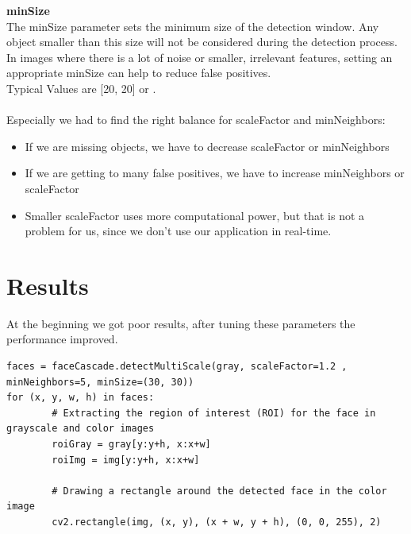 \documentclass[11pt, a4paper, twocolumn]{article}
\begin{document}
\textbf{minSize}\\
The minSize parameter sets the minimum size of the detection window. Any object smaller than this size will not be considered during the detection process.
In images where there is a lot of noise or smaller, irrelevant features, setting an appropriate minSize can help to reduce false positives.\\
Typical Values are [20, 20] or .\\\\
Especially we had to find the right balance for scaleFactor and minNeighbors:
\begin{itemize}
    \item If we are missing objects, we have to decrease scaleFactor or minNeighbors
    \item If we are getting to many false positives, we have to increase minNeighbors or scaleFactor
    \item Smaller scaleFactor uses more computational power, but that is not a problem for us, since we don’t use our application in real-time.
\end{itemize}
%


\section*{Results}

At the beginning we got poor results, after tuning these parameters the performance improved.

\begin{lstlisting}
faces = faceCascade.detectMultiScale(gray, scaleFactor=1.2 , minNeighbors=5, minSize=(30, 30))
for (x, y, w, h) in faces:
        # Extracting the region of interest (ROI) for the face in grayscale and color images
        roiGray = gray[y:y+h, x:x+w] 
        roiImg = img[y:y+h, x:x+w]

        # Drawing a rectangle around the detected face in the color image
        cv2.rectangle(img, (x, y), (x + w, y + h), (0, 0, 255), 2)

\end{lstlisting}
\end{document}
